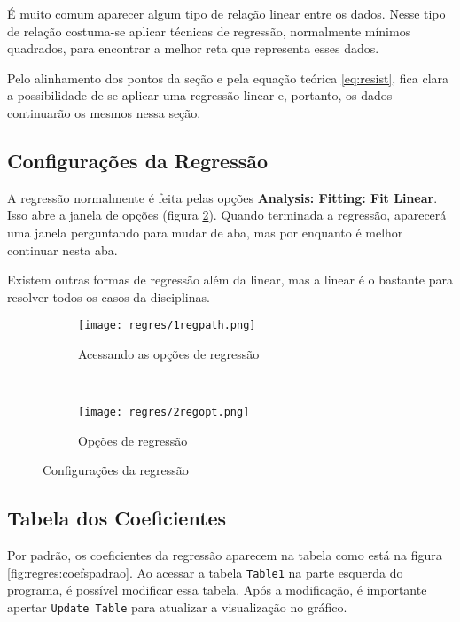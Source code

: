 É muito comum aparecer algum tipo de relação linear entre os dados. Nesse tipo de relação costuma-se aplicar técnicas de regressão, normalmente mínimos quadrados, para encontrar a melhor reta que representa esses dados.

Pelo alinhamento dos pontos da seção  e pela equação teórica \ref{eq:resist}, fica clara a possibilidade de se aplicar uma regressão linear e, portanto, os dados continuarão os mesmos nessa seção.


\subsection{Configurações da Regressão}

    A regressão normalmente é feita pelas opções \textbf{Analysis: Fitting: Fit Linear}. Isso abre a janela de opções (figura \ref{fig:regres:opt}). Quando terminada a regressão, aparecerá uma janela perguntando para mudar de aba, mas por enquanto é melhor continuar nesta aba.

    Existem outras formas de regressão além da linear, mas a linear é o bastante para resolver todos os casos da disciplinas.

    \begin{figure}[htbp]
        \centering
        \begin{subfigure}{0.60\textwidth}
            \centering
            \texttt{[image: regres/1regpath.png]}

            \caption{Acessando as opções de regressão}
            \label{fig:regres:path}
        \end{subfigure}
        ~
        \begin{subfigure}{0.35\textwidth}
            \centering
            \texttt{[image: regres/2regopt.png]}

            \caption{Opções de regressão}
            \label{fig:regres:opt}
        \end{subfigure}
        \caption{Configurações da regressão}
        \label{fig:regres:config}
    \end{figure}


\subsection{Tabela dos Coeficientes}

    Por padrão, os coeficientes da regressão aparecem na tabela como está na figura \ref{fig:regres:coefspadrao}. Ao acessar a tabela \texttt{Table1} na parte esquerda do programa, é possível modificar essa tabela. Após a modificação, é importante apertar \texttt{Update Table} para atualizar a visualização no gráfico.

